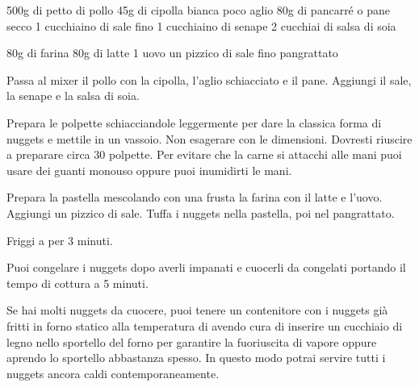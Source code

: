 \begin{ingreds}
	500g di petto di pollo
	45g di cipolla bianca
	poco aglio
	80g di pancarré o pane secco
	1 cucchiaino di sale fino
	1 cucchiaino di senape
	2 cucchiai di salsa di soia

\columnbreak
{}
	80g di farina
	80g di latte
	1 uovo
	un pizzico di sale fino
	pangrattato
\end{ingreds}

\begin{method}
Passa al mixer il pollo con la cipolla, l'aglio schiacciato e il pane. Aggiungi il sale, la senape e la salsa di soia.

Prepara le polpette schiacciandole leggermente per dare la classica forma di nuggets e mettile in un vassoio. Non esagerare con le dimensioni. Dovresti riuscire a preparare circa 30 polpette. Per evitare che la carne si attacchi alle mani puoi usare dei guanti monouso oppure puoi inumidirti le mani.

Prepara la pastella mescolando con una frusta la farina con il latte e l'uovo. Aggiungi un pizzico di sale. Tuffa i nuggets nella pastella, poi nel pangrattato.

Friggi a  per 3 minuti.

\end {method}

	\begin{note}
		Puoi congelare i nuggets dopo averli impanati e cuocerli da congelati portando il tempo di cottura a 5 minuti.

		Se hai molti nuggets da cuocere, puoi tenere un contenitore con i nuggets già fritti in forno statico alla temperatura di  avendo cura di inserire un cucchiaio di legno nello sportello del forno per garantire la fuoriuscita di vapore oppure aprendo lo sportello abbastanza spesso. In questo modo potrai servire tutti i nuggets ancora caldi contemporaneamente.
	\end{note}


